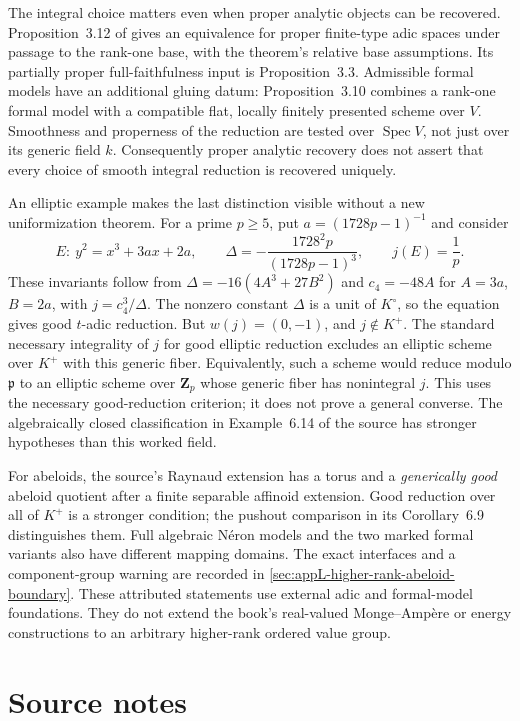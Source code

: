 The integral choice matters even when proper analytic objects can be
recovered. Proposition~3.12 of \cite{KaibWerner26HigherRankV1} gives an
equivalence for proper finite-type adic spaces under passage to the
rank-one base, with the theorem's relative base assumptions. Its
partially proper full-faithfulness input is Proposition~3.3.
Admissible formal models have an additional gluing datum: Proposition~3.10
combines a rank-one formal model with a compatible flat, locally finitely
presented scheme over $V$. Smoothness and properness of the reduction
are tested over $\operatorname{Spec}V$, not just over its generic field $k$.
Consequently proper analytic recovery does not assert that every choice
of smooth integral reduction is recovered uniquely.

An elliptic example makes the last distinction visible without a new
uniformization theorem. For a prime $p\geq5$, put
$a=(1728p-1)^{-1}$ and consider
\[
 E:\ y^2=x^3+3ax+2a,
 \qquad
 \Delta=-\frac{1728^2p}{(1728p-1)^3},\qquad j(E)=\frac1p.
\]
These invariants follow from $\Delta=-16(4A^3+27B^2)$ and
$c_4=-48A$ for $A=3a$, $B=2a$, with $j=c_4^3/\Delta$.
The nonzero constant $\Delta$ is a unit of $K^\circ$, so the equation
gives good $t$-adic reduction. But $w(j)=(0,-1)$, and $j\notin K^+$.
The standard necessary integrality of $j$ for good elliptic reduction
excludes an elliptic scheme over $K^+$ with this generic fiber.
Equivalently, such a scheme would reduce modulo $\mathfrak p$ to an
elliptic scheme over $\mathbf Z_p$ whose generic fiber has nonintegral
$j$. This uses the necessary good-reduction criterion; it does not
prove a general converse. The algebraically closed classification in
Example~6.14 of the source has stronger hypotheses than this worked field.

For abeloids, the source's Raynaud extension has a torus and a
\emph{generically good} abeloid quotient after a finite separable
affinoid extension. Good reduction over all of $K^+$ is a stronger
condition; the pushout comparison in its Corollary~6.9 distinguishes them.
Full algebraic N\'eron models and the two marked formal variants also
have different mapping domains. The exact interfaces and a component-group
warning are recorded in \cref{sec:appL-higher-rank-abeloid-boundary}.
These attributed statements use external adic and formal-model foundations.
They do not extend the book's real-valued Monge--Amp\`ere or energy
constructions to an arbitrary higher-rank ordered value group.

\section*{Source notes}

